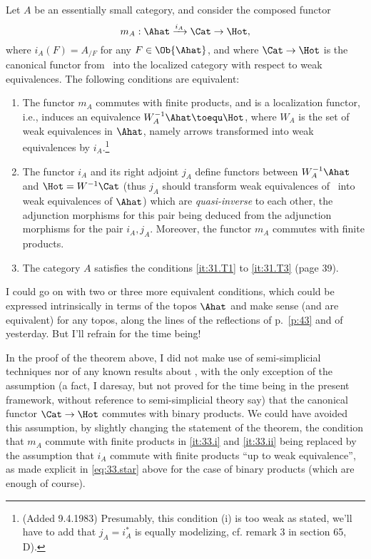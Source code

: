 \begin{theorem}
Let $A$ be an essentially small category,
and consider the composed functor
\[ m_A : \Ahat \xrightarrow{i_A} \Cat \to \Hot,\]
where $i_A(F)=A_{/F}$ for any $F\in\Ob{\Ahat}$, and where
$\Cat\to\Hot$ is the canonical functor from \Cat\ into the localized
category with respect to weak equivalences. The following conditions
are equivalent:
\begin{enumerate}[label=(\roman*),font=\normalfont]
\item\label{it:33.i}
  The functor $m_A$ commutes with finite products, and is a
  localization functor, i.e., induces an equivalence $W_A^{-1}\Ahat
  \toequ\Hot$, where $W_A$ is the set of weak equivalences in
  $\Ahat$, namely arrows transformed into weak equivalences by
  $i_A$.\footnote{(Added 9.4.1983) Presumably, this condition (i) is too weak as stated, we'll have to add that $j_A = i_A^*$ is equally modelizing, cf. remark 3 in section 65, D).}
\item\label{it:33.ii}
  The functor $i_A$ and its right adjoint $j_A$ define functors
  between $W_A^{-1}\Ahat$ and $\Hot=W^{-1}\Cat$ \textup{(}thus $j_A$
  should transform weak equivalences of \Cat\ into weak equivalences
  of $\Ahat$\textup{)} which are \emph{quasi-inverse} to each other, the
  adjunction morphisms for this pair being deduced from the adjunction
  morphisms for the pair $i_A,j_A$. Moreover, the functor $m_A$
  commutes with finite products.
\item\label{it:33.iii}
  The category $A$ satisfies the conditions \textup{\ref{it:31.T1}} to
  \textup{\ref{it:31.T3}} \textup{(}page 39\textup{)}.
\end{enumerate}
\end{theorem}

I could go on with two or three more equivalent conditions, which
could be expressed intrinsically in terms of the topos $\Ahat$
and make sense (and are equivalent) for any topos, along the lines of
the reflections of p.~\ref{p:43} and of yesterday. But
I'll refrain for the time being!

In the proof of the theorem above, I did not make use of
semi-simplicial techniques nor of any known results about \Hot, with
the only exception of the assumption (a fact, I daresay, but not
proved for the time being in the present framework, without reference
to semi-simplicial theory say) that the canonical functor
$\Cat\to\Hot$ commutes with binary products. We could have avoided
this assumption, by slightly changing the statement of the theorem,
the condition that $m_A$ commute with finite products in \ref{it:33.i}
and \ref{it:33.ii} being replaced by the assumption that $i_A$ commute
with finite products ``up to weak equivalence'', as made explicit in
\eqref{eq:33.star} above for the case of binary products (which are
enough of course).

